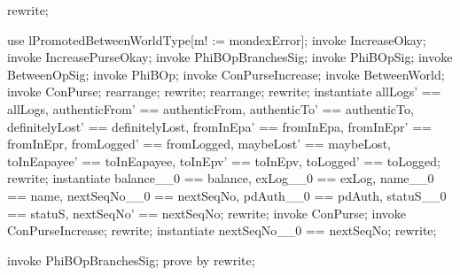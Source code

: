 \begin{LPScript}\begin{zproof}
    rewrite;
\end{zproof}\end{LPScript}

\begin{LPScript}\begin{zproof}[tBetwIncreaseOkayPRE]
    use lPromotedBetweenWorldType[m! := mondexError];
    invoke IncreaseOkay;
    invoke IncreasePurseOkay;
    invoke PhiBOpBranchesSig;
    invoke PhiBOpSig;
    invoke BetweenOpSig;
    invoke PhiBOp;
    invoke \Xi ConPurseIncrease;
    invoke \Delta BetweenWorld;
    invoke \Delta ConPurse;
    rearrange;
    rewrite;
    rearrange;
    rewrite;
    instantiate allLogs' == allLogs, authenticFrom' == authenticFrom,
        authenticTo' == authenticTo, definitelyLost' == definitelyLost,
        fromInEpa' == fromInEpa, fromInEpr' == fromInEpr,
        fromLogged' == fromLogged, maybeLost' == maybeLost,
        toInEapayee' == toInEapayee, toInEpv' == toInEpv,
        toLogged' == toLogged;
    rewrite;
    instantiate balance\_\_0 == balance, exLog\_\_0 == exLog,
        name\_\_0 == name, nextSeqNo\_\_0 == nextSeqNo,
        pdAuth\_\_0 == pdAuth, statuS\_\_0 == statuS,
        nextSeqNo' == nextSeqNo;
    rewrite;
    invoke \Delta ConPurse;
    invoke ConPurseIncrease;
    rewrite;
    instantiate nextSeqNo\_\_0 == nextSeqNo;
    rewrite;
\end{zproof}\end{LPScript}

\begin{LPScript}\begin{zproof}
    invoke PhiBOpBranchesSig;
    prove by rewrite;
\end{zproof}\end{LPScript}

\begin{LPScript}\end{LPScript}

